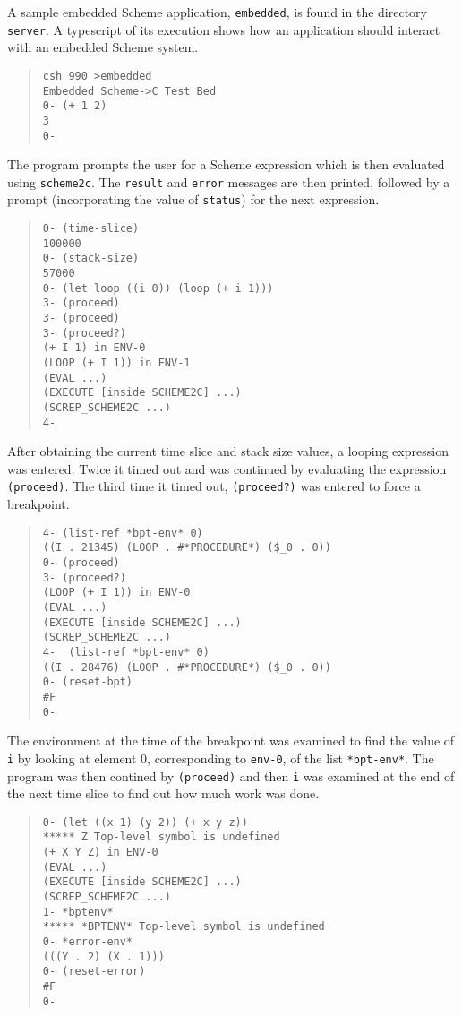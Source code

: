 \documentclass[12pt]{article}
\begin{document}
A sample embedded Scheme application, \texttt{embedded}, is found in the
directory \texttt{server}.  A typescript of its execution shows how an
application should interact with an embedded Scheme system.
\begin{quote}
\begin{verbatim}
csh 990 >embedded
Embedded Scheme->C Test Bed
0- (+ 1 2)
3
0-
\end{verbatim}
\end{quote}
The program prompts the user for a Scheme expression which is then
evaluated using \texttt{scheme2c}.  The \texttt{result} and \texttt{error} messages
are then printed, followed by a prompt (incorporating the value of
\texttt{status}) for the next expression.
\begin{quote}
\begin{verbatim}
0- (time-slice)
100000
0- (stack-size)
57000
0- (let loop ((i 0)) (loop (+ i 1)))
3- (proceed)
3- (proceed)
3- (proceed?)
(+ I 1) in ENV-0
(LOOP (+ I 1)) in ENV-1
(EVAL ...)
(EXECUTE [inside SCHEME2C] ...)
(SCREP_SCHEME2C ...)
4-
\end{verbatim}
\end{quote}
After obtaining the current time slice and stack size values, a
looping expression was entered.  Twice it timed out and was continued
by evaluating the expression \texttt{(proceed)}.  The third time it timed
out, \texttt{(proceed?)} was entered to force a breakpoint.
\begin{quote}
\begin{verbatim}
4- (list-ref *bpt-env* 0)
((I . 21345) (LOOP . #*PROCEDURE*) ($_0 . 0))
0- (proceed)
3- (proceed?)
(LOOP (+ I 1)) in ENV-0
(EVAL ...)
(EXECUTE [inside SCHEME2C] ...)
(SCREP_SCHEME2C ...)
4-  (list-ref *bpt-env* 0)
((I . 28476) (LOOP . #*PROCEDURE*) ($_0 . 0))
0- (reset-bpt)
#F
0-
\end{verbatim}
\end{quote}
The environment at the time of the breakpoint was examined to find
the value of \texttt{i} by looking at element 0, corresponding to
\texttt{env-0}, of the list \texttt{*bpt-env*}.  The program was then contined
by \texttt{(proceed)} and then \texttt{i} was examined at the end of the next
time slice to find out how much work was done.
\begin{quote}
\begin{verbatim}
0- (let ((x 1) (y 2)) (+ x y z))
***** Z Top-level symbol is undefined
(+ X Y Z) in ENV-0
(EVAL ...)
(EXECUTE [inside SCHEME2C] ...)
(SCREP_SCHEME2C ...)
1- *bptenv*
***** *BPTENV* Top-level symbol is undefined
0- *error-env*
(((Y . 2) (X . 1)))
0- (reset-error)
#F
0-
\end{verbatim}
\end{quote}
\end{document}
